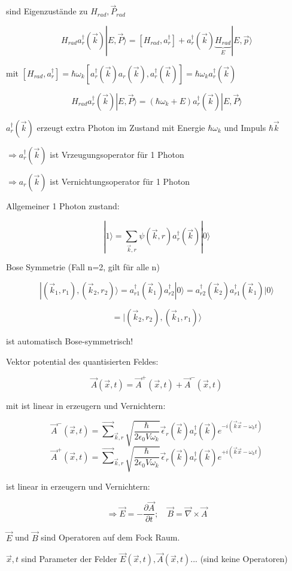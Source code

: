 sind Eigenzustände zu \(H_{rad},\vec P_{rad}\)

\[ H_{rad}a^\dagger_r(\vec k) |E,\vec P\rangle  =  [H_{rad},a^\dagger_r]+a^\dagger_r(\vec k)\underbrace{H_{rad}}_{E}|E,\vec p\rangle \]


mit \([H_{rad},a^\dagger_r] = \hbar\omega_k[a^\dagger_r(\vec k) a_r(\vec k),a^\dagger_r(\vec k)] =\hbar\omega_k a^\dagger_r(\vec k)  \)

\[ H_{rad}a^\dagger_r(\vec k) |E,\vec P\rangle  = (\hbar\omega_k+E) a^\dagger_r(\vec k)|E,\vec P\rangle  \]

\( a^\dagger_r(\vec k) \) erzeugt extra Photon im Zustand mit Energie \(\hbar\omega_k\) und Impuls \(\hbar \vec k\)

\(\Rightarrow  a^\dagger_r(\vec k) \) ist Vrzeugungsoperator für 1 Photon

\(\Rightarrow  a_r(\vec k) \) ist Vernichtungsoperator für 1 Photon


Allgemeiner 1 Photon zustand:

\[|1\rangle  = \sum_{\vec k,r}\psi(\vec k,r)a^\dagger_r(\vec k)|0\rangle \]

Bose Symmetrie (Fall n=2, gilt für alle n)


\[|(\vec k_1,r_1),(\vec k_2,r_2)\rangle = a^\dagger_{r1}(\vec k_1) a^\dagger_{r2} |0\rangle =  a^\dagger_{r2}(\vec k_2) a^\dagger_{r1}(\vec k_1) |0\rangle   \]

\[= |(\vec k_2,r_2),(\vec k_1,r_1)\rangle    \]

ist automatisch Bose-symmetrisch!


Vektor potential des quantisierten Feldes:

\[\vec A(\vec x,t) = \vec A^+(\vec x,t) +\vec A^-(\vec x,t)  \]


mit ist linear in erzeugern und Vernichtern:

\[\vec A^-(\vec x,t) =\vec \sum_{\vec k,r} \sqrt{\frac{\hbar}{2\epsilon_0 V\omega_k}}\vec \epsilon_r(\vec k)a^\dagger_r(\vec k)e^{-i(\vec k\vec x-\omega_k t)}\]
\[\vec A^+(\vec x,t) =\vec \sum_{\vec k,r} \sqrt{\frac{\hbar}{2\epsilon_0 V\omega_k}}\vec \epsilon_r(\vec k)a^\dagger_r(\vec k)e^{+i(\vec k\vec x-\omega_k t)}\]

ist linear in erzeugern und Vernichtern:

\[\Rightarrow \vec E = -\frac{\partial \vec A}{\partial t};\quad \vec B = \vec\nabla\times\vec A\]

\(\vec E\) und \(\vec B\) sind Operatoren auf dem Fock Raum.

\(\vec x,t\) sind Parameter der Felder \(\vec E(\vec x,t),\vec A(\vec x,t)...\) (sind keine Operatoren)


